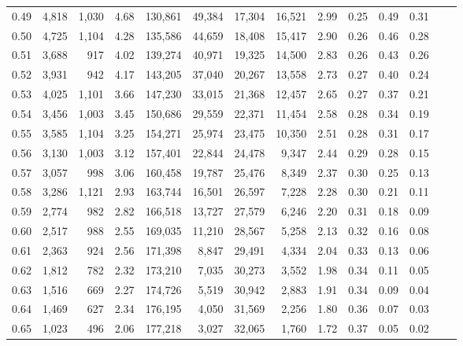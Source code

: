 \begin{tabular}{rrrrrrrrrrrrrr}
0.49 &  4,818 &  1,030 &    4.68 &  130,861 &   49,384 &  17,304 &  16,521 &  2.99 &  0.25 &  0.49 &      0.31 \\
0.50 &  4,725 &  1,104 &    4.28 &  135,586 &   44,659 &  18,408 &  15,417 &  2.90 &  0.26 &  0.46 &      0.28 \\
0.51 &  3,688 &    917 &    4.02 &  139,274 &   40,971 &  19,325 &  14,500 &  2.83 &  0.26 &  0.43 &      0.26 \\
0.52 &  3,931 &    942 &    4.17 &  143,205 &   37,040 &  20,267 &  13,558 &  2.73 &  0.27 &  0.40 &      0.24 \\
0.53 &  4,025 &  1,101 &    3.66 &  147,230 &   33,015 &  21,368 &  12,457 &  2.65 &  0.27 &  0.37 &      0.21 \\
0.54 &  3,456 &  1,003 &    3.45 &  150,686 &   29,559 &  22,371 &  11,454 &  2.58 &  0.28 &  0.34 &      0.19 \\
0.55 &  3,585 &  1,104 &    3.25 &  154,271 &   25,974 &  23,475 &  10,350 &  2.51 &  0.28 &  0.31 &      0.17 \\
0.56 &  3,130 &  1,003 &    3.12 &  157,401 &   22,844 &  24,478 &   9,347 &  2.44 &  0.29 &  0.28 &      0.15 \\
0.57 &  3,057 &    998 &    3.06 &  160,458 &   19,787 &  25,476 &   8,349 &  2.37 &  0.30 &  0.25 &      0.13 \\
0.58 &  3,286 &  1,121 &    2.93 &  163,744 &   16,501 &  26,597 &   7,228 &  2.28 &  0.30 &  0.21 &      0.11 \\
0.59 &  2,774 &    982 &    2.82 &  166,518 &   13,727 &  27,579 &   6,246 &  2.20 &  0.31 &  0.18 &      0.09 \\
0.60 &  2,517 &    988 &    2.55 &  169,035 &   11,210 &  28,567 &   5,258 &  2.13 &  0.32 &  0.16 &      0.08 \\
0.61 &  2,363 &    924 &    2.56 &  171,398 &    8,847 &  29,491 &   4,334 &  2.04 &  0.33 &  0.13 &      0.06 \\
0.62 &  1,812 &    782 &    2.32 &  173,210 &    7,035 &  30,273 &   3,552 &  1.98 &  0.34 &  0.11 &      0.05 \\
0.63 &  1,516 &    669 &    2.27 &  174,726 &    5,519 &  30,942 &   2,883 &  1.91 &  0.34 &  0.09 &      0.04 \\
0.64 &  1,469 &    627 &    2.34 &  176,195 &    4,050 &  31,569 &   2,256 &  1.80 &  0.36 &  0.07 &      0.03 \\
0.65 &  1,023 &    496 &    2.06 &  177,218 &    3,027 &  32,065 &   1,760 &  1.72 &  0.37 &  0.05 &      0.02 \\

\end{tabular}
